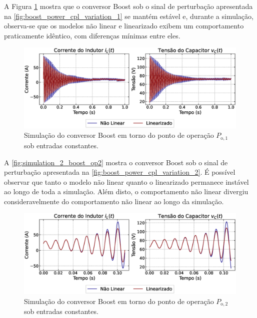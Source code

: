 A Figura \ref{fig:simulation_2_boost_op1} mostra que o conversor Boost sob o sinal de perturbação apresentada na \autoref{fig:boost_power_cpl_variation_1} se mantém estável e, durante a simulação, observa-se que os modelos não linear e linearizado exibem um comportamento praticamente idêntico, com diferenças mínimas entre eles.

 
\begin{figure}[H]
  \centering
  \captionsetup{justification=centering}
  \includegraphics[width=1.\textwidth]{figuras/boost/sim2/op1/result.eps}
  \caption{Simulação do conversor Boost em torno do ponto de operação $P_{\mathrm{o}, 1}$ sob entradas constantes.}
  \label{fig:simulation_2_boost_op1}
\end{figure}

A \autoref{fig:simulation_2_boost_op2} mostra o conversor Boost sob o sinal de perturbação apresentada na \autoref{fig:boost_power_cpl_variation_2}. É possível observar que tanto o modelo não linear quanto o linearizado permanece instável ao longo de toda a simulação. Além disto, o comportamento não linear  divergiu consideravelmente do comportamento não linear ao longo da simulação.

\begin{figure}[H]
  \centering
  \captionsetup{justification=centering}
  \includegraphics[width=1.\textwidth]{figuras/boost/sim2/op2/result.eps}
  \caption{Simulação do conversor Boost em torno do ponto de operação $P_{\mathrm{o}, 2}$ sob entradas constantes.}
  \label{fig:simulation_2_boost_op2}
\end{figure}
